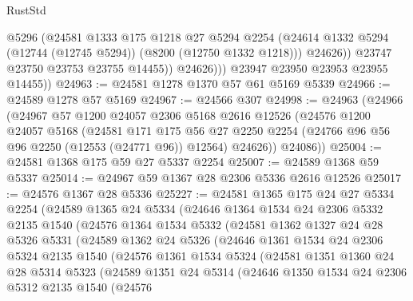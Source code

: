 \begin{lexlean}{RustStd}
\begin{coremodule}
                    @5296
                    (@24581
                      @1333
                      @175
                      @1218
                      @27
                      @5294
                      @2254
                      (@24614 @1332 @5294 (@12744 (@12745 @5294)) (@8200 (@12750 @1332 @1218)))
                      @24626))
                  @23747
                  @23750
                  @23753
                  @23755
                  @14455))
              @24626)))
        @23947
        @23950
        @23953
        @23955
        @14455))
@24963 := @24581 @1278 @1370 @57 @61 @5169 @5339
@24966 := @24589 @1278 @57 @5169
@24967 := @24566 @307
@24998 := @24963
    (@24966
      (@24967
        @57
        @1200
        @24057
        @2306
        @5168
        @2616
        @12526
        (@24576
          @1200
          @24057
          @5168
          (@24581
            @171
            @175
            @56
            @27
            @2250
            @2254
            (@24766 @96 @56 @96 @2250 (@12553 (@24771 @96)) @12564)
            @24626))
        @24086))
@25004 := @24581 @1368 @175 @59 @27 @5337 @2254
@25007 := @24589 @1368 @59 @5337
@25014 := @24967 @59 @1367 @28 @2306 @5336 @2616 @12526
@25017 := @24576 @1367 @28 @5336
@25227 := @24581
    @1365
    @175
    @24
    @27
    @5334
    @2254
    (@24589
      @1365
      @24
      @5334
      (@24646
        @1364
        @1534
        @24
        @2306
        @5332
        @2135
        @1540
        (@24576
          @1364
          @1534
          @5332
          (@24581
            @1362
            @1327
            @24
            @28
            @5326
            @5331
            (@24589
              @1362
              @24
              @5326
              (@24646
                @1361
                @1534
                @24
                @2306
                @5324
                @2135
                @1540
                (@24576
                  @1361
                  @1534
                  @5324
                  (@24581
                    @1351
                    @1360
                    @24
                    @28
                    @5314
                    @5323
                    (@24589
                      @1351
                      @24
                      @5314
                      (@24646
                        @1350
                        @1534
                        @24
                        @2306
                        @5312
                        @2135
                        @1540
                        (@24576

\end{coremodule}
\end{lexlean}
